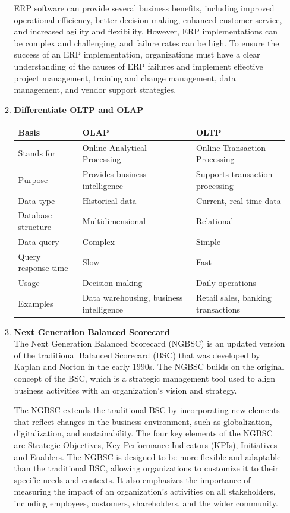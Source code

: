 \documentclass[12pt]{article}
\begin{document}
\begin{enumerate}
\begin{enumerate}
ERP software can provide several business benefits, including improved operational efficiency, better decision-making, enhanced customer service, and increased agility and flexibility. However, ERP implementations can be complex and challenging, and failure rates can be high. To ensure the success of an ERP implementation, organizations must have a clear understanding of the causes of ERP failures and implement effective project management, training and change management, data management, and vendor support strategies.
    \item {\bfseries  Differentiate OLTP and OLAP}
    { \begin{longtable}{ |L{3cm}|L{4.5cm}|L{4.5cm}| }
        \hline
        Basis& OLAP & OLTP \\
        \hline
        Stands for & Online Analytical Processing & Online Transaction Processing \\
        \hline
        Purpose & Provides business intelligence & Supports transaction processing \\
        \hline
        Data type & Historical data & Current, real-time data \\
        \hline
        Database structure & Multidimensional & Relational \\
        \hline
        Data query & Complex & Simple \\
        \hline
        Query response time & Slow & Fast \\
        \hline
        Usage & Decision making & Daily operations \\
        \hline
        Examples & Data warehousing, business intelligence & Retail sales, banking transactions \\
        \hline
        \end{longtable}}
    \item {\bfseries  Next Generation Balanced Scorecard\\}
    The Next Generation Balanced Scorecard (NGBSC) is an updated version of the traditional Balanced Scorecard (BSC) that was developed by Kaplan and Norton in the early 1990s. The NGBSC builds on the original concept of the BSC, which is a strategic management tool used to align business activities with an organization's vision and strategy.

    The NGBSC extends the traditional BSC by incorporating new elements that reflect changes in the business environment, such as globalization, digitalization, and sustainability. The four key elements of the NGBSC are Strategic Objectives, Key Performance Indicators (KPIs), Initiatives and Enablers.
    The NGBSC is designed to be more flexible and adaptable than the traditional BSC, allowing organizations to customize it to their specific needs and contexts. It also emphasizes the importance of measuring the impact of an organization's activities on all stakeholders, including employees, customers, shareholders, and the wider community.
\end{enumerate}
\end{enumerate}
\end{document}
